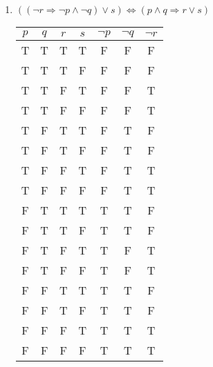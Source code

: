 \documentclass{article}
\begin{document}
\begin{enumerate}
\begin{enumerate}
			\item $((\neg r \Rightarrow \neg p \wedge \neg q) \vee s) \Leftrightarrow (p \wedge q \Rightarrow r \vee s)$
			
				\begin{tabular}{|c|c|c|c|c|c|c|}
					\hline
					$p$ & $q$ & $r$ & $s$ & $\neg p$ & $\neg q$ & $\neg r$\\
					\hline
					T & T & T & T & F & F & F\\
					\hline
					T & T & T  & F & F & F & F\\
					\hline
					T & T & F & T & F & F & T\\
					\hline
					T & T & F & F & F & F & T\\
					\hline
					T & F & T & T & F & T & F\\
					\hline
					T & F & T & F & F & T  & F\\
					\hline
					T & F & F & T & F & T & T\\
					\hline
					T & F & F & F & F & T & T\\
					\hline
					F & T & T & T & T & T & F\\
					\hline
					F & T & T & F & T & T & F\\
					\hline
					F & T & F & T & T & F & T\\
					\hline
					F & T & F & F & T & F & T\\
					\hline 
					F & F & T & T & T & T & F\\
					\hline
					F & F & T & F & T & T & F\\
					\hline
					F & F & F & T & T & T & T\\
					\hline
					F & F & F & F & T & T & T\\
					\hline
				\end{tabular}
		\end{enumerate}
\end{enumerate}
\end{document}
